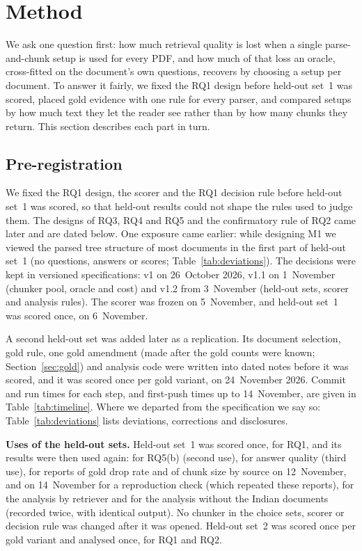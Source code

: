 \section{Method}\label{sec:method}

We ask one question first: how much retrieval quality is lost when a single
parse-and-chunk setup is used for every PDF, and how much of that loss an
oracle, cross-fitted on the document's own questions, recovers by choosing a
setup per document. To answer it fairly, we
fixed the RQ1 design before held-out set~1 was scored, placed gold evidence with one
rule for every parser, and compared setups by how much text they let the reader
see rather than by how many chunks they return. This section describes each
part in turn.


\subsection{Pre-registration}\label{sec:prereg}

We fixed the RQ1 design, the scorer and the RQ1 decision rule before held-out
set~1 was scored, so that held-out results could not shape the rules used to judge them. The designs of RQ3, RQ4 and RQ5 and the
confirmatory rule of RQ2 came later and are dated below.
One exposure came earlier: while designing M1 we viewed the parsed tree structure
of most documents in the first part of held-out set~1 (no questions, answers or
scores; Table~\ref{tab:deviations}).
The decisions were kept in versioned specifications: v1 on 26~October 2026,
v1.1 on 1~November (chunker pool, oracle and cost) and v1.2 from 3~November
(held-out sets, scorer and analysis rules). The scorer was frozen on
5~November, and held-out set~1 was scored once, on 6~November.

A second held-out set was added later as a replication. Its document
selection, gold rule, one gold amendment (made after the gold counts were
known; Section~\ref{sec:gold}) and analysis code were written into dated notes
before it was scored, and it was scored once per gold variant, on
24~November 2026. Commit and run times for each step,
and first-push times up to 14~November, are given in
Table~\ref{tab:timeline}. Where we departed from the specification we say so:
Table~\ref{tab:deviations} lists \DeviationCount{} deviations,
\CorrectionCount{} corrections and \DisclosureCount{} disclosures.

\textbf{Uses of the held-out sets.} Held-out set~1 was scored once, for RQ1, and
its results were then used again: for RQ5(b) (second use), for answer quality
(third use), for reports of gold drop rate and of chunk size by source on
12~November, and on 14~November for a reproduction check (which repeated
these reports), for the analysis by retriever and for the analysis without the Indian
documents (recorded twice, with identical output). No chunker in the choice sets, scorer or decision
rule was changed after it was opened. Held-out set~2 was scored once per gold
variant and analysed once, for RQ1 and RQ2.

